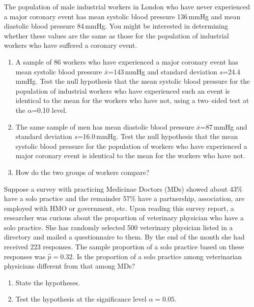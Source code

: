 \begin{problem} 
  The population of male industrial workers in London who have never experienced a major coronary event has mean systolic blood pressure 136\,mmHg and mean diastolic blood pressure 84\,mmHg. You might be interested in determining whether these values are the same as those for the population of industrial workers who have suffered a coronary event.
  \begin{enumerate}
  \item A sample of 86 workers who have experienced a major coronary event has mean systolic blood pressure $\overline{x}$=143\,mmHg and standard deviation $s$=24.4\,mmHg. Test the null hypothesis that the mean systolic blood pressure for the population of industrial workers who have experienced such an event is identical to the mean for the workers who have not, using a two--sided test at the $\alpha$=0.10 level.
  \item The same sample of men has mean diastolic blood pressure
    $\overline{x}$=87\,mmHg and standard deviation $s$=16.0\,mmHg. Test the null hypothesis that the mean systolic blood pressure for the population of workers who have experienced a major coronary event is identical to the mean for the workers who have not.
  \item How do the two groups of workers compare?
\end{enumerate}
\end{problem}




\begin{problem}   %
  Suppose a survey with practicing Medicinae Doctors (MDs) showed about 43\% have a solo
  practice and the remainder 57\% have a partnership, association, are
  employed with HMO or government, etc. Upon reading this survey
  report, a  researcher was curious about the proportion of veterinary physician
  who have a solo practice. She has randomly selected 500 veterinary physician
  listed in a directory and mailed a 
  questionnaire to them. By the end of the month she had
  received 223 responses. The sample proportion of a solo practice
  based on these responses was $\hat{p} = 0.32$. Is the proportion of
  a solo practice among veterinarian physicians different from that among MDs? 
  \begin{enumerate}
  \item State the hypotheses.
  \item Test the hypothesis at the significance level $\alpha = 0.05$.
  \end{enumerate}

\end{problem}

